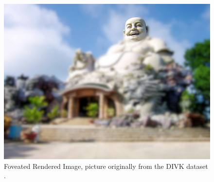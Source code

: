 \begin{figure}[ht]
    \includegraphics[width=\textwidth,height=\textheight,keepaspectratio]{logos/FoveatedImage.png}
     \caption{Foveated Rendered Image, picture originally from the DIVK dataset \parencite{Agustsson2017}.}
    \label{fig:foveated-rendering}
\end{figure}

